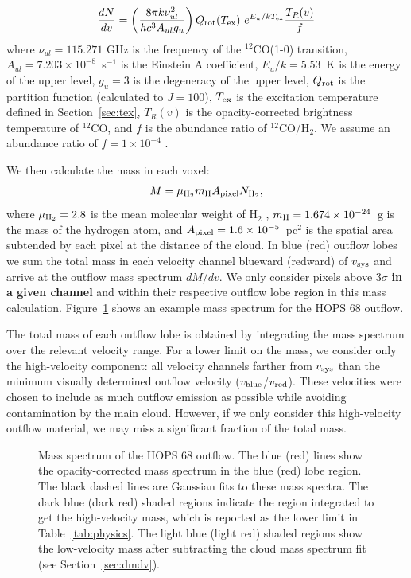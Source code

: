 \documentclass[twocolumn]{aastex63}
\newcommand{\example}{HOPS 68}
\newcommand{\co}[1][]{\ensuremath{^{#1}}CO}
\begin{document}
\begin{equation}\label{eq:dNdv}
\frac{dN}{dv} = \left(\frac{8\pi k \nu^2_{ul}}{h c^3 A_{ul} g_u}\right) Q_{\rm rot}(T_{\rm ex})~ e^{E_u / kT_{\rm ex}} \frac{T_R(v)}{f}
\end{equation}
where $\nu_{ul} = 115.271$ GHz is the frequency of the \co[12](1-0) transition, $A_{ul} = 7.203 \times 10^{-8}$~s$^{-1}$ is the Einstein A coefficient, $E_u/k = 5.53$~K is the energy of the upper level, $g_u = 3$ is the degeneracy of the upper level, $Q_{\rm rot}$ is the partition function (calculated to $J=100$), $T_{\rm ex}$ is the excitation temperature defined in Section~\ref{sec:tex}, $T_R(v)$ is the opacity-corrected brightness temperature of \co[12]{}, and $f$ is the abundance ratio of 
\co[12]/H$_{2}$. We assume an abundance ratio of $f = 1 \times 10 ^{-4}$ \citep{Frerking82}.

We then calculate the mass in each voxel:
\begin{equation}\label{eq:mass}
M = \mu_{\rm H_2} m_{\rm H} A_{\rm pixel} N_{\rm H_2},
\end{equation}
where $\mu_{\rm H_2} = 2.8$ is the mean molecular weight of H$_2$ \citep{Kauffmann08}, $m_{\rm H} = 1.674 \times 10^{-24}$~g is the mass of the hydrogen atom, and $A_{\rm pixel} = 1.6 \times 10^{-5}$~pc$^2$ is the spatial area subtended by each pixel at the distance of the cloud. In blue (red) outflow lobes we sum the total mass in each velocity channel blueward (redward) of $v_{\rm sys}$ and arrive at the outflow mass spectrum $dM/dv$. We only consider pixels above $3\sigma$ \textbf{in a given channel} and within their respective outflow lobe region in this mass calculation. Figure~\ref{fig:dmdv} shows an example mass spectrum for the \example{} outflow.

The total mass of each outflow lobe is obtained by integrating the mass spectrum over the relevant velocity range. For a lower limit on the mass, we consider only the high-velocity component: all velocity channels farther from $v_{\rm sys}$ than the minimum visually determined outflow velocity ($v_{\rm blue}$/$v_{\rm red}$). These velocities were chosen to include as much outflow emission as possible while avoiding contamination by the main cloud. However, if we only consider this high-velocity outflow material, we may miss a significant fraction of the total mass.

\begin{figure}
\caption{Mass spectrum of the \example{} outflow. The blue (red) lines show the opacity-corrected mass spectrum in the blue (red) lobe region. The black dashed lines are Gaussian fits to these mass spectra. The dark blue (dark red) shaded regions indicate the region integrated to get the high-velocity mass, which is reported as the lower limit in Table~\ref{tab:physics}. The light blue (light red) shaded regions show the low-velocity mass after subtracting the cloud mass spectrum fit (see Section~\ref{sec:dmdv}).\label{fig:dmdv}}
\end{figure}
\end{document}

